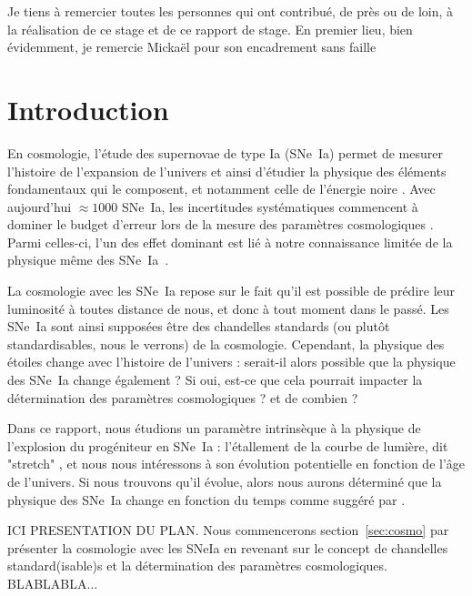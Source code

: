 \documentclass[a4paper, 12pt, svgnames]{article}
\newcommand{\mr}[1]{{\textcolor[rgb]{0.80,0.10,0.1}{#1}}}
\begin{document}

Je tiens à remercier toutes les personnes qui ont contribué, de près ou de loin,
à la réalisation de ce stage et de ce rapport de stage. En premier lieu, bien
évidemment, je remercie Mickaël  pour son encadrement sans faille

\tableofcontents
\newpage

\section{Introduction}\label{sec:int}

En cosmologie, l'étude des supernovae de type Ia (SNe~Ia) permet de mesurer
l'histoire de l'expansion de l'univers et ainsi d'étudier la physique des
éléments fondamentaux qui le composent, et notamment celle de l'énergie noire
\cite{perlmutter_measurements_1999, riess_observational_1998}. Avec aujourd'hui
$\approx1000$ SNe~Ia, les incertitudes systématiques commencent à dominer le
budget d'erreur lors de la mesure des paramètres cosmologiques
\cite{betoule_improved_2014, scolnic_complete_2018}. Parmi celles-ci, l'un des
effet dominant est lié à notre connaissance limitée de la physique même des
SNe~Ia~\cite{sullivan_dependence_2010, rigault_evidence_2013,
rigault_confirmation_2015}.

La cosmologie avec les SNe~Ia repose sur le fait qu'il est possible de prédire
leur luminosité à toutes distance de nous, et donc à tout moment dans le passé.
Les SNe~Ia sont ainsi supposées être des chandelles standards (ou plutôt
standardisables, nous le verrons) de la cosmologie. Cependant, la physique des
étoiles change avec l'histoire de l'univers : serait-il alors possible que la
physique des SNe~Ia change également ? Si oui, est-ce que cela pourrait impacter
la détermination des paramètres cosmologiques ? et de combien ?

Dans ce rapport, nous étudions un paramètre intrinsèque à la physique
de l'explosion du progéniteur en SNe~Ia : l'étallement de la courbe de lumière,
dit "stretch" \cite{phillips_99}, et nous nous intéressons à son évolution
potentielle en fonction de l'âge de l'univers. Si nous trouvons qu'il évolue,
alors nous aurons déterminé que la physique des SNe~Ia change en fonction du
temps comme suggéré par
\cite{howell_effect_2009, rigault_evidence_2013, childress_ages_2014,
rigault_strong_2018}.

\mr{ICI PRESENTATION DU PLAN. Nous commencerons section~\ref{sec:cosmo} par
présenter la cosmologie avec les SNeIa en revenant sur le concept de chandelles
standard(isable)s et la détermination des paramètres cosmologiques.
BLABLABLA...}
\end{document}
